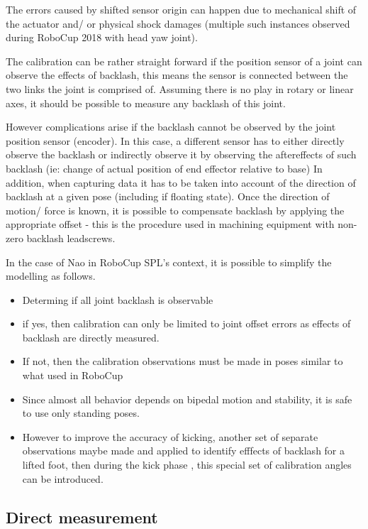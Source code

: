 \documentclass[english, printversion, nomenclature, notitle]{tuvisionthesis} %
\begin{document}
The errors caused by shifted sensor origin can happen due to mechanical shift of the actuator and/ or physical shock damages (multiple such instances observed during RoboCup 2018 with head yaw joint).

The calibration can be rather straight forward if the position sensor of a joint can observe the effects of backlash, this means the sensor is connected between the two links the joint is comprised of. Assuming there is no play in rotary or linear axes, it should be possible to measure any backlash of this joint.

However complications arise if the backlash cannot be observed by the joint position sensor (encoder). In this case, a different sensor has to either directly observe the backlash or indirectly observe it by observing the aftereffects of such backlash (ie: change of actual position of end effector relative to base)  In addition, when capturing data it has to be taken into account of the direction of backlash at a given pose (including if floating state). Once the direction of motion/ force is known, it is possible to compensate backlash by applying the appropriate offset - this is the procedure used in machining equipment with non-zero backlash leadscrews.

In the case of Nao in RoboCup SPL's context, it is possible to simplify the modelling as follows.
\begin{itemize}
	\item Determing if all joint backlash is observable
	\item if yes, then calibration can only be limited to joint offset errors as effects of backlash are directly measured.
	\item If not, then the calibration observations must be made in poses similar to what used in RoboCup
	\item Since almost all behavior depends on bipedal motion and stability, it is safe to use only standing poses. 
	\item However to improve the accuracy of kicking, another set of separate observations maybe made and applied to identify efffects of backlash for a lifted foot, then during the kick phase , this special set of calibration angles can be introduced.
\end{itemize}

\subsection{Direct measurement}
\end{document}

